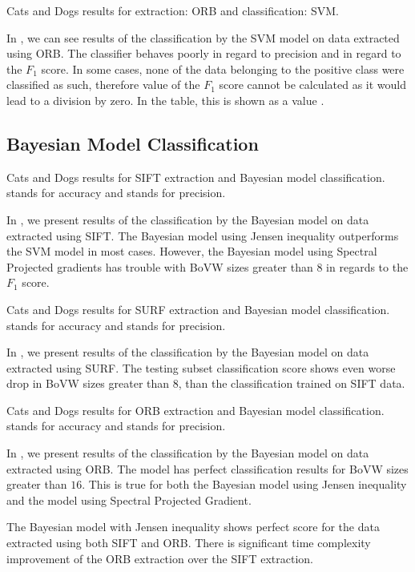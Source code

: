 \begin{table}[ht!]
    \centering
    
    \caption[Cats and Dogs results for extraction: ORB and classification: SVM]{Cats and Dogs results for extraction: ORB and classification: SVM.}
    \label{tab:iiit_ORB_SVM}
\end{table}
In , we can see results of the classification by the SVM model on data extracted using ORB. The classifier behaves poorly in regard to precision and in regard to the $F_1$ score. In some cases, none of the data belonging to the positive class were classified as such, therefore value of the $F_1$ score cannot be calculated as it would lead to a division by zero. In the table, this is shown as a value .

\subsection{Bayesian Model Classification}
\begin{table}[ht!]
    \centering
    
    \caption[Cats and Dogs results for SIFT extraction and Bayesian model classification]{Cats and Dogs results for SIFT extraction and Bayesian model classification.  stands for accuracy and  stands for precision.}
    \label{tab:iiit_SIFT_bayes}
\end{table}
In , we present results of the classification by the Bayesian model on data extracted using SIFT. The Bayesian model using Jensen inequality outperforms the SVM model in most cases. However, the Bayesian model using Spectral Projected gradients has trouble with BoVW sizes greater than $8$ in regards to the $F_1$ score.

\begin{table}[ht!]
    \centering
    
    \caption[Cats and Dogs results for SURF extraction and Bayesian model classification]{Cats and Dogs results for SURF extraction and Bayesian model classification.  stands for accuracy and  stands for precision.}
    \label{tab:iiit_SURF_bayes}
\end{table}
In , we present results of the classification by the Bayesian model on data extracted using SURF. The testing subset classification score shows even worse drop in BoVW sizes greater than $8$, than the classification trained on SIFT data.

\begin{table}[ht!]
    \centering
    
    \caption[Cats and Dogs results for ORB extraction and Bayesian model classification]{Cats and Dogs results for ORB extraction and Bayesian model classification.  stands for accuracy and  stands for precision.}
    \label{tab:iiit_ORB_bayes}
\end{table}
In , we present results of the classification by the Bayesian model on data extracted using ORB. The model has perfect classification results for BoVW sizes greater than $16$. This is true for both the Bayesian model using Jensen inequality and the model using Spectral Projected Gradient.

The Bayesian model with Jensen inequality shows perfect score for the data extracted using both SIFT and ORB. There is significant time complexity improvement of the ORB extraction over the SIFT extraction.
